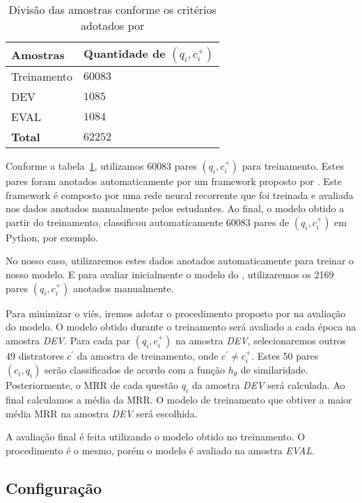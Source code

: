 \documentclass[12pt]{article}
\begin{document}
\begin{table}[h]
\centering
\begin{tabular}{ |p{3cm}|p{3cm}|  }
 \hline
 \textbf{Amostras} & \textbf{Quantidade de $(q_{i}, c_{i}^{+})$}\\
 \hline
 Treinamento & $60083$\\
 \hline
 DEV & $1085$ \\
 \hline
 EVAL & $1084$\\
 \hline
 \textbf{Total} & $62252$\\
 \hline
\end{tabular}
\caption{Divisão das amostras conforme os critérios adotados por \cite{iyer-etal-2016-summarizing}}
\label{table:divisao-amostras}
\end{table}

Conforme a tabela~\ref{table:divisao-amostras}, utilizamos 60083 pares $(q_{i}, c_{i}^{+})$ para treinamento. Estes pares foram anotados automaticamente por um framework proposto por \cite{Yao-staqc:2018}. Este framework é composto por uma rede neural recorrente que foi treinada e avaliada nos dados anotados manualmente pelos estudantes. Ao final, o modelo obtido a partir do treinamento, classificou automaticamente 60083 pares de $(q_{i}, c_{i}^{+})$ em Python, por exemplo.

No nosso caso, utilizaremos estes dados anotados automaticamente para treinar o nosso modelo. E para avaliar inicialmente o modelo do \cite{tan-lstm-qa}, utilizaremos os 2169 pares $(q_{i}, c_{i}^{+})$ anotados manualmente.

Para minimizar o viés, iremos adotar o procedimento proposto por \cite{iyer-etal-2016-summarizing} na avaliação do modelo. O modelo obtido durante o treinamento será avaliado a cada época na amostra \emph{DEV}. Para cada par $(q_{i}, c_{i}^{+})$ na amostra \emph{DEV}, selecionaremos outros 49 distratores $c^{'}$ da amostra de treinamento, onde $c^{'} \neq c_{i}^{+}$. Estes 50 pares $(c_{i}, q_{i})$ serão classificados de acordo com a função $h_{\theta}$ de similaridade. Posteriormente, o MRR de cada questão $q_{i}$ da amostra \emph{DEV} será calculada. Ao final calculamos a média da MRR. O modelo de treinamento que obtiver a maior média MRR na amostra \emph{DEV} será escolhida. 

A avaliação final é feita utilizando o modelo obtido no treinamento. O procedimento é o mesmo, porém o modelo é avaliado na amostra \emph{EVAL}. 


\subsection{Configuração}
\end{document}
